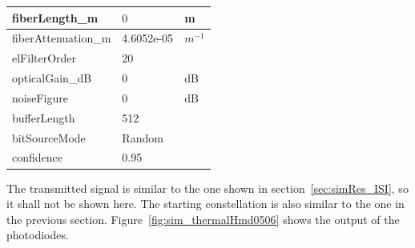 \begin{longtable}[h]{|l|l|l|}
	fiberLength\_m                & $0$                  & m \\\hline
	fiberAttenuation\_m           & 4.6052e-05           & $m^{-1}$ \\\hline
	elFilterOrder                 & 20                   & \\\hline
	opticalGain\_dB               & 0                    & dB \\\hline
	noiseFigure                   & 0                    & dB \\\hline
	bufferLength                  & 512                  & \\\hline
	bitSourceMode                 & Random               & \\\hline
	confidence                    & 0.95                 & \\\hline
\end{longtable}

The transmitted signal is similar to the one shown in 
section~\ref{sec:simRes_ISI}, so it shall not be shown here.  The starting 
constellation is also similar to the one in the previous section.
Figure~\ref{fig:sim_thermalHmd0506} shows the output of the photodiodes.


